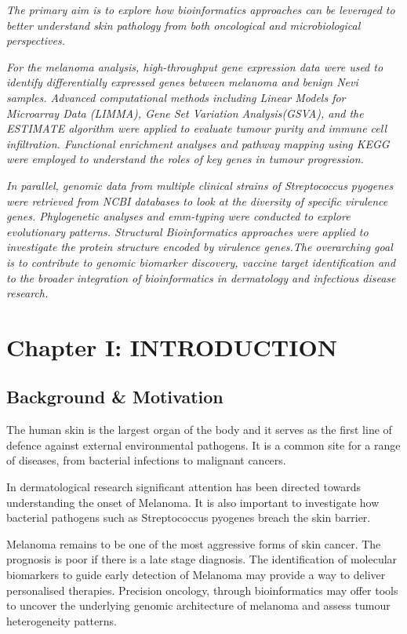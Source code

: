 \documentclass[
]{article}
\begin{document}
\emph{The primary aim is to explore how bioinformatics approaches can be
leveraged to better understand skin pathology from both oncological and
microbiological perspectives.}

\emph{For the melanoma analysis, high-throughput gene expression data
were used to identify differentially expressed genes between melanoma
and benign Nevi samples. Advanced computational methods including Linear
Models for Microarray Data (LIMMA), Gene Set Variation Analysis(GSVA),
and the ESTIMATE algorithm were applied to evaluate tumour purity and
immune cell infiltration. Functional enrichment analyses and pathway
mapping using KEGG were employed to understand the roles of key genes in
tumour progression.}

\emph{In parallel, genomic data from multiple clinical strains of
Streptococcus pyogenes were retrieved from NCBI databases to look at the
diversity of specific virulence genes. Phylogenetic analyses and
emm-typing were conducted to explore evolutionary patterns. Structural
Bioinformatics approaches were applied to investigate the protein
structure encoded by virulence genes.The overarching goal is to
contribute to genomic biomarker discovery, vaccine target identification
and to the broader integration of bioinformatics in dermatology and
infectious disease research.}

\newpage

\section{Chapter I: INTRODUCTION}\label{chapter-i-introduction}

\subsection{Background \& Motivation}\label{background-motivation}

The human skin is the largest organ of the body and it serves as the
first line of defence against external environmental pathogens. It is a
common site for a range of diseases, from bacterial infections to
malignant cancers.

In dermatological research significant attention has been directed
towards understanding the onset of Melanoma. It is also important to
investigate how bacterial pathogens such as Streptococcus pyogenes
breach the skin barrier.

Melanoma remains to be one of the most aggressive forms of skin cancer.
The prognosis is poor if there is a late stage diagnosis. The
identification of molecular biomarkers to guide early detection of
Melanoma may provide a way to deliver personalised therapies. Precision
oncology, through bioinformatics may offer tools to uncover the
underlying genomic architecture of melanoma and assess tumour
heterogeneity patterns.
\end{document}
